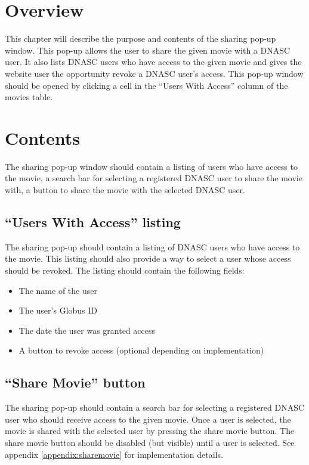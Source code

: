 
\section{Overview}

This chapter will describe the purpose and contents of the sharing pop-up window. This 
pop-up allows the user to share the given movie with a DNASC user. It also lists 
DNASC users who have access to the given movie and gives the website user the opportunity 
revoke a DNASC user's access. This pop-up window should be opened by clicking a cell in 
the ``Users With Access'' column of the movies table.

\section{Contents}

The sharing pop-up window should contain a listing of users who have access to the movie,
a search bar for selecting a registered DNASC user to share the movie with, a button to 
share the movie with the selected DNASC user.

\subsection{``Users With Access'' listing}

The sharing pop-up should contain a listing of DNASC users who have access to the movie.
This listing should also provide a way to select a user whose access should be revoked. 
The listing should contain the following fields:

\begin{itemize}\itemsep1pt
    \item The name of the user
    \item The user's Globus ID
    \item The date the user was granted access
    \item A button to revoke access (optional depending on implementation)
\end{itemize}

\subsection{``Share Movie'' button}

The sharing pop-up should contain a search bar for selecting a registered DNASC user 
who should receive access to the given movie. Once a user is selected, the movie is
shared with the selected user by pressing the share movie button. The share movie button 
should be disabled (but visible) until a user is selected. See appendix 
\ref{appendix:sharemovie} for implementation details.